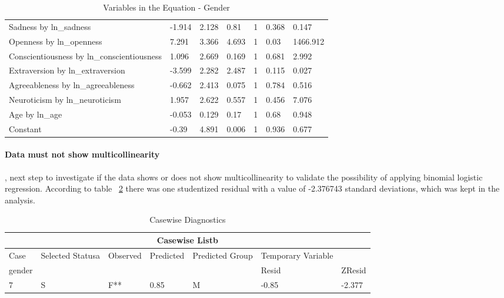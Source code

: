 \documentclass{llncs}
\begin{document}
\begin{table}[!ht]
\begin{tabular}{@{}lllllll@{}}
Sadness by ln\_sadness                     & -1.914 & 2.128  & 0.81  & 1     & 0.368 & 0.147    \\
Openness by ln\_openness                   & 7.291  & 3.366  & 4.693 & 1     & 0.03  & 1466.912 \\
Conscientiousness by ln\_conscientiousness & 1.096  & 2.669  & 0.169 & 1     & 0.681 & 2.992    \\
Extraversion by ln\_extraversion           & -3.599 & 2.282  & 2.487 & 1     & 0.115 & 0.027    \\
Agreeableness by ln\_agreeableness         & -0.662 & 2.413  & 0.075 & 1     & 0.784 & 0.516    \\
Neuroticism by ln\_neuroticism             & 1.957  & 2.622  & 0.557 & 1     & 0.456 & 7.076    \\
Age by ln\_age                             & -0.053 & 0.129  & 0.17  & 1     & 0.68  & 0.948    \\
Constant                                   & -0.39  & 4.891  & 0.006 & 1     & 0.936 & 0.677    \\ \bottomrule
\end{tabular}
\caption{Variables in the Equation -  Gender}
\label{tbl:LineraityCheckGender}
\end{table}

\paragraph{Data must not show multicollinearity}, next step to investigate if the data shows or does not show multicollinearity to validate the possibility of applying binomial logistic regression. According to table ~\ref{tbl:GenderCasewiseDiagnostics} there was one studentized residual with a value of -2.376743 standard deviations, which was kept in the analysis.

\begin{table}[!ht]
\centering
\begin{tabular}{@{}lllllll@{}}
\toprule
\multicolumn{7}{c}{\textbf{Casewise Listb}}                                                      \\ \midrule
Case   & Selected Statusa & Observed & Predicted & Predicted Group & Temporary Variable &        \\
gender &                  &          &           &                 & Resid              & ZResid \\
7      & S                & F**      & 0.85      & M               & -0.85              & -2.377 \\ \bottomrule
\end{tabular}
\caption{Casewise Diagnostics}
\label{tbl:GenderCasewiseDiagnostics}
\end{table}
\end{document}
